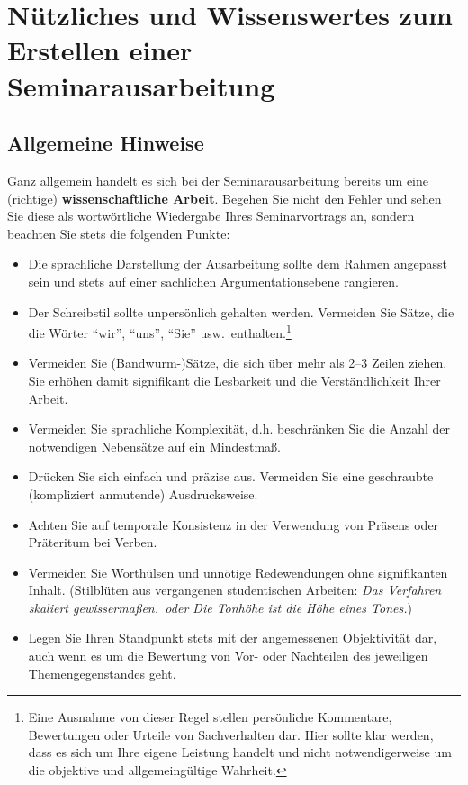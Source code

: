 %
\section{Nützliches und Wissenswertes zum Erstellen einer Seminarausarbeitung}
\label{sec_stil}

\subsection{Allgemeine Hinweise}
Ganz allgemein handelt es sich bei der Seminarausarbeitung bereits um eine (richtige) {\bf wissenschaftliche Arbeit}.
Begehen Sie nicht den Fehler und sehen Sie diese als wortwörtliche Wiedergabe Ihres Seminarvortrags an, sondern beachten Sie stets die folgenden Punkte:
\begin{itemize}
\item Die sprachliche Darstellung der Ausarbeitung sollte dem Rahmen angepasst sein und stets auf einer sachlichen Argumentationsebene rangieren.
\item Der Schreibstil sollte unpersönlich gehalten werden. 
Vermeiden Sie Sätze, die die Wörter "`wir"', "`uns"', "`Sie"' usw.~enthalten.\footnote{Eine Ausnahme von dieser Regel stellen persönliche Kommentare, Bewertungen oder Urteile von Sachverhalten dar. Hier sollte klar werden, dass es sich um Ihre eigene Leistung handelt und nicht notwendigerweise um die objektive und allgemeingültige Wahrheit.}
\item Vermeiden Sie (Bandwurm-)Sätze, die sich über mehr als 2--3 Zeilen ziehen. Sie erhöhen damit signifikant die Lesbarkeit und die Verständlichkeit  Ihrer Arbeit.
\item Vermeiden Sie sprachliche Komplexität, d.h. beschränken Sie die Anzahl der notwendigen Nebensätze auf ein Mindestmaß.
\item Drücken Sie sich einfach und präzise aus. Vermeiden Sie eine \glqq geschraubte\grqq\, (kompliziert anmutende) Ausdrucksweise.
\item Achten Sie auf temporale Konsistenz in der Verwendung von Präsens oder Präteritum bei Verben.
\item Vermeiden Sie Worthülsen und unnötige Redewendungen ohne signifikanten Inhalt. (Stilblüten aus vergangenen studentischen Arbeiten: \textit{\glqq Das Verfahren skaliert gewissermaßen.\grqq\, oder \glqq Die Tonhöhe ist die Höhe eines Tones.\grqq})
\item Legen Sie Ihren Standpunkt stets mit der angemessenen Objektivität dar, auch wenn es um die Bewertung von Vor- oder Nachteilen des jeweiligen Themengegenstandes geht.

\end{itemize}
